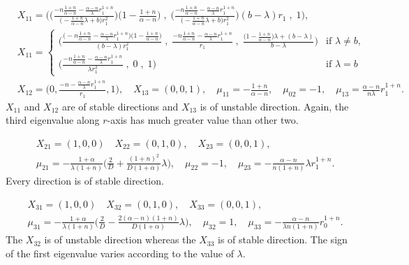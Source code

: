 \documentclass[a4paper,11pt]{article}
\begin{document}
\begin{align*}
&X_{11} = \bigg(  \Big(\frac{-n\frac{1+n}{\alpha-n} - \frac{\alpha-n}{\lambda}r_1^{1+n}}{\big(-\frac{1+n}{\alpha-n} \lambda +b\big) r_1^2}\Big)\Big(1-\frac{1+n}{\alpha-n}\Big) \;,\;\Big(\frac{-n\frac{1+n}{\alpha-n} - \frac{\alpha-n}{\lambda}r_1^{1+n}}{\big(-\frac{1+n}{\alpha-n} \lambda +b\big) r_1^2}\Big)(b-\lambda)r_1\;,\;1\bigg),\\
&X_{11} = 
\begin{cases}
\bigg(  \frac{\Big(-n\frac{1+n}{\alpha-n} - \frac{\alpha-n}{\lambda}r_1^{1+n}\Big)\Big(1-\frac{1+n}{\alpha-n}\Big)}{(b-\lambda)r_1^2}\;,\;\frac{-n\frac{1+n}{\alpha-n} - \frac{\alpha-n}{\lambda}r_1^{1+n}}{r_1}\;,\;\frac{\big(1-\frac{1+n}{\alpha-n}\big)\lambda + (b-\lambda)}{b-\lambda}\bigg) &\text{if $\lambda\ne b$,}\\
\bigg(  \frac{-n\frac{1+n}{\alpha-n} - \frac{\alpha-n}{\lambda}r_1^{1+n}}{\lambda r_1^2}\;,\;0\;,\;1\bigg) & \text{if $\lambda=b$}
\end{cases}\\
 &X_{12} = \bigg(0, \frac{-n- \frac{\alpha-n}{\lambda}r_1^{1+n}}{r_1}, 1\bigg), \quad
 X_{13} = (0,0,1), \quad \mu_{11} =-\frac{1+n}{\alpha-n}, \quad \mu_{02}=-1, \quad \mu_{13} = \frac{\alpha-n}{n\lambda}r_1^{1+n}.
\end{align*}
$X_{11}$ and $X_{12}$ are of stable directions and $X_{13}$ is of unstable direction. Again, the third eigenvalue along $r$-axis has much greater value than other two.
\medskip

\begin{align*}
 &X_{21} = (1,0,0) \quad X_{22}=(0,1,0), \quad X_{23}=(0,0,1),\\
 &\mu_{21} =-\frac{1+\alpha}{\lambda(1+n)} \Big(\frac{2}{D} + \frac{(1+n)^2}{D(1+\alpha)}\lambda\Big), \quad \mu_{22}=-1, \quad \mu_{23} = -\frac{\alpha-n}{n(1+n)}\lambda r_1^{1+n}.
\end{align*}
Every direction is of stable direction.
\medskip

\begin{align*}
 &X_{31} = (1,0,0) \quad X_{32}=(0,1,0), \quad X_{33}=(0,0,1),\\
 &\mu_{31} =-\frac{1+\alpha}{\lambda(1+n)} \Big(\frac{2}{D} - \frac{2(\alpha-n)(1+n)}{D(1+\alpha)}\lambda\Big), \quad \mu_{32}=1, \quad \mu_{33} = -\frac{\alpha-n}{\lambda n(1+n)}r_0^{1+n}.
\end{align*}
The $X_{32}$ is of unstable direction whereas the $X_{33}$ is of stable direction. The sign of the first eigenvalue varies according to the value of $\lambda$.
\end{document}
